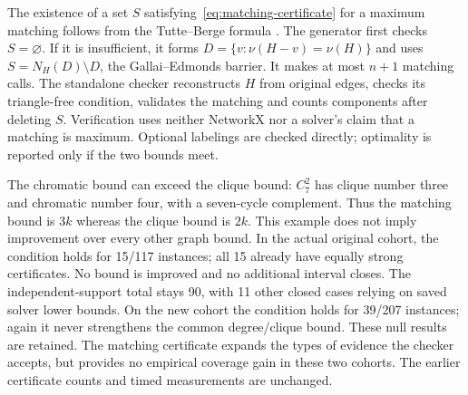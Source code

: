 The existence of a set $S$ satisfying~\eqref{eq:matching-certificate}
for a maximum matching follows from the Tutte--Berge formula
\cite{goemans2017matching}. The generator first checks $S=\varnothing$.
If it is insufficient, it forms
$D=\{v:\nu(H-v)=\nu(H)\}$ and uses $S=N_H(D)\setminus D$, the
Gallai--Edmonds barrier. It makes at most $n+1$ matching calls. The
standalone checker reconstructs $H$ from original edges, checks its
triangle-free condition, validates the matching and counts components
after deleting $S$. Verification uses neither NetworkX nor a solver's
claim that a matching is maximum. Optional labelings are checked
directly; optimality is reported only if the two bounds meet.

The chromatic bound can exceed the clique bound: $C_7^2$ has clique
number three and chromatic number four, with a seven-cycle complement.
Thus the matching bound is $3k$ whereas the clique bound is $2k$.
This example does not imply improvement over every other graph bound.
In the actual original cohort, the condition holds for 15/117 instances;
all 15 already have equally strong certificates. No bound is improved
and no additional interval closes. The independent-support total stays
90, with 11 other closed cases relying on saved solver lower bounds.
On the new cohort the condition holds for 39/207 instances; again it
never strengthens the common degree/clique bound. These null results
are retained. The matching certificate expands the types of evidence
the checker accepts, but provides no empirical coverage gain in these
two cohorts. The earlier certificate counts and timed measurements are
unchanged.
